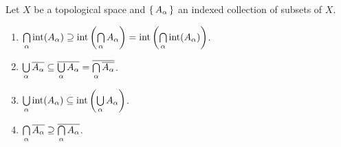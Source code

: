 \documentclass[letterpaper, 11pt]{article}
\begin{document}
\begin{prop}
  Let $X$ be a topological space and $\set{A_{\alpha}}$ an indexed collection of subsets of $X$.
  \begin{enumerate}
  \item $\Bigcap_{\alpha} \inte(A_{\alpha}) \containseq \inte\pqty{\Bigcap_{\alpha} A_{\alpha}} = \inte\pqty{\Bigcap_{\alpha} \inte(A_{\alpha})}$.
  \item $\bigcup\limits_{\alpha} \overline{A_{\alpha}} \subseteq \overline{\bigcup\limits_{\alpha} A_{\alpha}} = \overline{\bigcap\limits_{\alpha} \overline{A_{\alpha}}}$.
  \item $\Bigcup_{\alpha} \inte(A_{\alpha}) \subseteq \inte\pqty{\Bigcup_{\alpha} A_{\alpha}}$.
  \item $\bigcap\limits_{\alpha} \overline{A_{\alpha}} \supseteq \overline{\bigcap\limits_{\alpha} A_{\alpha}}$.
  \end{enumerate}
\end{prop}
\end{document}
